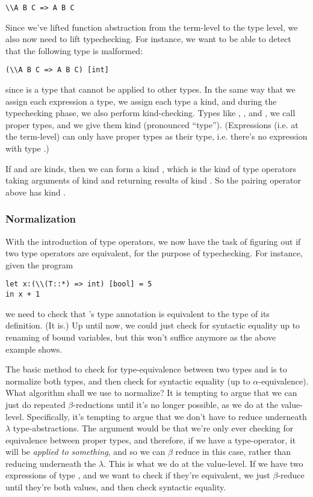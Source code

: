 \message{ !name(report.tex)}\documentclass[pageno]{jpaper}
\begin{document}
{{{\begin{lstlisting}
\\A B C => A B C
\end{lstlisting}

Since we've lifted function abstraction from the term-level to the type level, we also now need to lift
typechecking. For instance, we want to be able to detect that the following type is malformed:

\begin{lstlisting}
(\\A B C => A B C) [int]
\end{lstlisting}
since  is a type that cannot be applied to other types.
In the same way that we assign each expression a type, we assign each type a kind, and during the
typechecking phase, we also perform kind-checking. Types like , , and
, we call proper types, and we give them kind \lsti{*} (pronounced ``type'').
(Expressions (i.e. at the term-level) can only have proper types as their type, i.e. there's no
expression with type .)

If  and   are kinds, then we can form a kind , which is the kind of
type operators taking arguments of kind  and returning results of kind . So the pairing operator above has kind \lsti{* -> *}.

\subsubsection{Normalization}

With the introduction of type operators, we now have the task of figuring out if two type operators are
equivalent, for the purpose of typechecking. For instance, given the program
\begin{lstlisting}
let x:(\\(T::*) => int) [bool] = 5
in x + 1
\end{lstlisting}
we need to check that 's type annotation is equivalent to the type of its definition. (It is.)
Up until now, we could just check for syntactic equality up to renaming of bound variables, but this won't
suffice anymore as the above example shows.

The basic method to check for type-equivalence between two types  and  is to normalize
both types, and then check for syntactic equality (up to $\alpha$-equivalence).
What algorithm shall we use to normalize? 
It is tempting to argue that we can just do repeated $\beta$-reductions until
it's no longer possible, as we do at the value-level. Specifically, it's tempting to argue that we don't
have to reduce underneath $\lambda$ type-abstractions. The argument would be that we're only ever checking
for equivalence between proper types, and therefore, if we have a type-operator, it will be \textit{applied to something}, and so we can $\beta$ reduce in this case, rather than reducing underneath the $\lambda$.
This is what we do at the value-level. If we have two expressions of type , and we want to check
if they're equivalent, we just $\beta$-reduce until they're both values, and then check syntactic equality.

}}}
\end{document}
